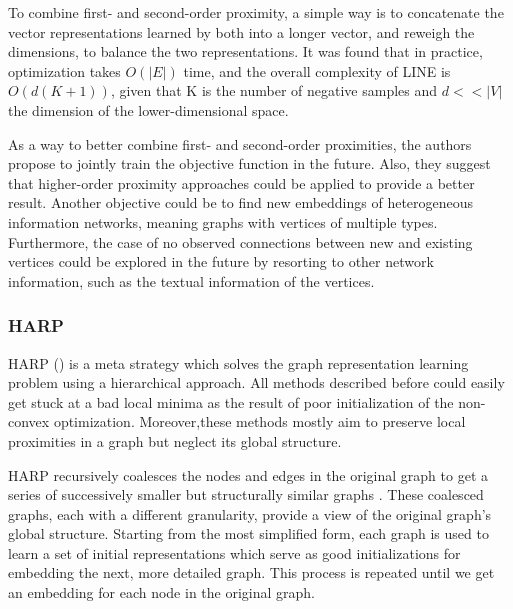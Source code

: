 To combine first- and second-order proximity, a simple way is to concatenate the vector representations learned by both into a longer vector, and reweigh the dimensions, to balance the two representations. It was found that in practice, optimization takes $O(|E|)$ time, and the overall complexity of LINE is $O(d(K+1))$, given that K is the number of negative samples and $d<<|V|$ the dimension of the lower-dimensional space.

As a way to better combine first- and second-order proximities, the authors propose to jointly train the objective function in the future. Also, they suggest that higher-order proximity approaches could be applied to provide a better result. Another objective could be to find new embeddings of heterogeneous information networks, meaning graphs with vertices of multiple types. Furthermore, the case of no observed connections between new and existing vertices could be explored in the future by resorting to other network information, such as the textual information of the vertices.

\subsubsection{HARP}

HARP (\cite{DBLP:journals/corr/ChenPHS17}) is a meta strategy which solves the graph representation learning problem using a hierarchical approach.
All methods described before could easily get stuck at a bad local minima as the result of poor initialization of the non-convex optimization. Moreover,these methods mostly aim to preserve local proximities in a graph but neglect its global structure.

HARP recursively coalesces the nodes and edges in the original graph to get a series of successively smaller but structurally similar graphs . These coalesced graphs, each with a different granularity, provide a view of the original graph’s global structure. Starting from the most simplified form, each graph is used to learn a set of initial representations which serve as good initializations for embedding the next, more detailed graph. This process is repeated until we get an embedding for each node in the original graph.

